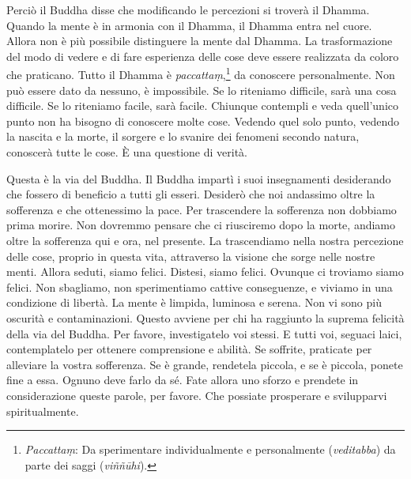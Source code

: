 Perciò il Buddha disse che modificando le percezioni si troverà il
Dhamma. Quando la mente è in armonia con il Dhamma, il Dhamma entra nel
cuore. Allora non è più possibile distinguere la mente dal Dhamma. La
trasformazione del modo di vedere e di fare esperienza delle cose deve
essere realizzata da coloro che praticano. Tutto il Dhamma è
\emph{paccattaṃ},\footnote{\emph{Paccattaṃ}: Da sperimentare
  individualmente e personalmente (\emph{veditabba}) da parte dei saggi
  (\emph{viññūhi}).} da conoscere personalmente. Non può essere dato da
nessuno, è impossibile. Se lo riteniamo difficile, sarà una cosa
difficile. Se lo riteniamo facile, sarà facile. Chiunque contempli e
veda quell'unico punto non ha bisogno di conoscere molte cose. Vedendo
quel solo punto, vedendo la nascita e la morte, il sorgere e lo svanire
dei fenomeni secondo natura, conoscerà tutte le cose. È una questione di
verità.

Questa è la via del Buddha. Il Buddha impartì i suoi insegnamenti
desiderando che fossero di beneficio a tutti gli esseri. Desiderò che
noi andassimo oltre la sofferenza e che ottenessimo la pace. Per
trascendere la sofferenza non dobbiamo prima morire. Non dovremmo
pensare che ci riusciremo dopo la morte, andiamo oltre la sofferenza qui
e ora, nel presente. La trascendiamo nella nostra percezione delle cose,
proprio in questa vita, attraverso la visione che sorge nelle nostre
menti. Allora seduti, siamo felici. Distesi, siamo felici. Ovunque ci
troviamo siamo felici. Non sbagliamo, non sperimentiamo cattive
conseguenze, e viviamo in una condizione di libertà. La mente è limpida,
luminosa e serena. Non vi sono più oscurità e contaminazioni. Questo
avviene per chi ha raggiunto la suprema felicità della via del Buddha.
Per favore, investigatelo voi stessi. E tutti voi, seguaci laici,
contemplatelo per ottenere comprensione e abilità. Se soffrite,
praticate per alleviare la vostra sofferenza. Se è grande, rendetela
piccola, e se è piccola, ponete fine a essa. Ognuno deve farlo da sé.
Fate allora uno sforzo e prendete in considerazione queste parole, per
favore. Che possiate prosperare e svilupparvi spiritualmente.

